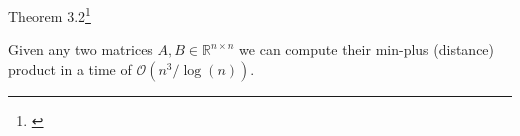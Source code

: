 \begin{frame}{Theorem 3.2\footnote[1]{\cite{Chan2007}} }
    \begin{theorem}\label{thm:mat_mul}
        Given any two matrices $A, B \in \mathbb{R}^{n \times n}$ we can compute their min-plus (distance) product in a time of $\mathcal{O}\left( n^3 / \log(n) \right)$.
    \end{theorem}

\end{frame}